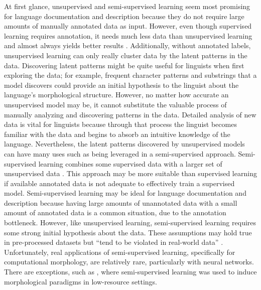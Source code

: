 At first glance, unsupervised and semi-supervised learning seem most promising for language documentation and description because they do not require large amounts of manually annotated data as input. However, even though supervised learning requires annotation, it needs much less data than unsupervised learning and almost always yields better results \citep{ruokolainen_supervised_2013,cotterell_labeled_2015}. Additionally, without annotated labels, unsupervised learning can only really cluster data by the latent patterns in the data. Discovering latent patterns might be quite useful for linguists when first exploring the data; for example, frequent character patterns and substrings that a model discovers could provide an initial hypothesis to the linguist about the language's morphological structure. However, no matter how accurate an unsupervised model may be, it cannot substitute the valuable process of manually analyzing and discovering patterns in the data. Detailed analysis of new data is vital for linguists because through that process the linguist becomes familiar with the data and begins to absorb an intuitive knowledge of the language. Nevertheless, the latent patterns discovered by unsupervised models can have many uses such as being leveraged in a semi-supervised approach. Semi-supervised learning combines some supervised data with a larger set of unsupervised data   \citep{kohonen_semi-supervised_2010,poon_unsupervised_2009}. This approach may be more suitable than supervised learning if available annotated data is not adequate to effectively train a supervised model. 
Semi-supervised learning may be ideal for language documentation and description because having large amounts of unannotated data with a small amount of annotated data is a common situation, due to the annotation bottleneck. However, like unsupervised learning, semi-supervised learning requires some strong initial hypothesis about the data. These assumptions may hold true in pre-processed datasets but ``tend to be violated in real-world data'' \citep{druck_reducing_2007}. Unfortunately, real applications of semi-supervised learning, specifically for computational morphology, are relatively rare, particularly with neural networks. There are exceptions, such as \citet{ahlberg_semi-supervised_2014}, where semi-supervised learning was used to induce morphological paradigms in low-resource settings. 

